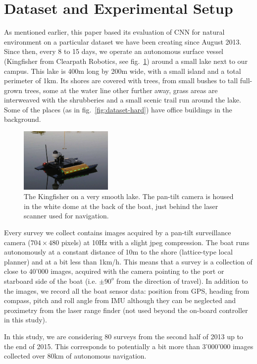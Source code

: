 \section{Dataset and Experimental Setup}
As mentioned earlier, this paper based its evaluation of CNN for natural
environment on a particular dataset we have been creating since August 2013.
Since then, every 8 to 15 days, we operate an autonomous surface vessel
(Kingfisher from Clearpath Robotics, see fig.~\ref{fig:kingfisher}) around a small lake next to our campus.
This lake is 400m long by 200m wide, with a small island and a total perimeter
of 1km. Its shores are covered with trees, from small bushes to tall full-grown
trees, some at the water line other further away, grass areas are interweaved
with the shrubberies and a small scenic trail run around the lake. Some of the
places (as in fig.~\ref{fig:dataset-hard}) have office buildings in the
background. 
\begin{figure}[htb]
    \centering
    \includegraphics[width=0.4\textwidth]{images/kingfisher}
    \caption{The Kingfisher on a very smooth lake. The pan-tilt camera is
        housed in the white dome at the back of the boat, just behind the laser
    scanner used for navigation.}
    \label{fig:kingfisher}
\end{figure}

Every survey we collect contains images acquired by a pan-tilt surveillance
camera ($704\times480$ pixels) at 10Hz with a slight jpeg compression. The boat
runs autonomously at a constant distance of 10m to the shore (lattice-type
local planner) and at a bit less than 1km/h. This means that a survey is a
collection of close to 40'000 images, acquired with the camera pointing to the
port or starboard side of the boat (i.e. $\pm90^o$ from the direction of
travel). In addition to the images, we record all the boat sensor data:
position from GPS, heading from compass, pitch and roll angle from IMU although
they can be neglected and proximetry from the laser range finder (not used
beyond the on-board controller in this study). 

In this study, we are considering 80 surveys from the second half of 2013 up to
the end of 2015. This corresponds to potentially a bit more than 3'000'000
images collected over 80km of autonomous navigation. 

